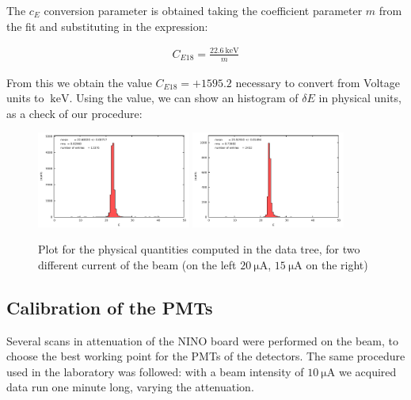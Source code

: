 The $c_{E}$ conversion parameter is obtained taking the coefficient parameter $m$ from the fit and substituting in the expression:

\begin{align*}
C_{E18} =  \frac{\SI{22.6}{\kilo \electronvolt}}{m}
\end{align*}

From this we obtain the value $C_{E18} = +1595.2$ necessary to convert from Voltage units to $\SI{}{\kilo \electronvolt}$. Using the value, we can show an histogram of $\delta E$ in physical units, as a check of our procedure:

\begin{figure}[!h]
\centering
\includegraphics[width = 0.45\textwidth]{Analysis/ENMOCheck20.pdf}
\includegraphics[width = 0.45\textwidth]{Analysis/ENMOCheck15.pdf} 
\caption{Plot for the physical quantities computed in the data tree, for two different current of the beam (on the left $\SI{20}{\micro \ampere}$, $\SI{15}{\micro \ampere}$ on the right)}
\end{figure}


\subsection{Calibration of the PMTs}

Several scans in attenuation of the NINO board were performed on the beam, to choose the best working point for the PMTs of the detectors. The same procedure used in the laboratory was followed: with a beam intensity of $\SI{10}{\micro \ampere}$ we acquired data run one minute long, varying the attenuation. 

